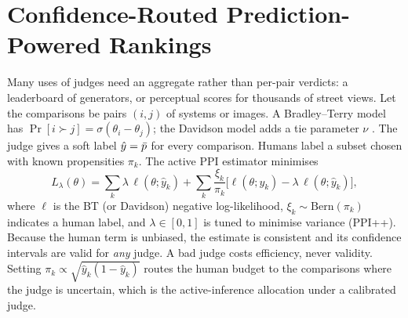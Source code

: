 \section{Confidence-Routed Prediction-Powered Rankings}\label{sec:ranking}

Many uses of judges need an aggregate rather than per-pair verdicts: a leaderboard of generators, or perceptual scores for thousands of street views.
Let the comparisons be pairs $(i,j)$ of systems or images. A Bradley--Terry model \citep{bradley1952rank} has $\Pr[i\succ j]=\sigma(\theta_i-\theta_j)$; the Davidson model adds a tie parameter $\nu$ \citep{davidson1970extending}.
The judge gives a soft label $\hat y=\bar p$ for every comparison. Humans label a subset chosen with known propensities $\pi_k$.
The active PPI estimator \citep{zrnic2024active,angelopoulos2023ppi} minimises
\begin{equation}\label{eq:ppibt}
  L_\lambda(\theta)=\sum_{k} \lambda\,\ell(\theta;\hat y_k)+\sum_k \frac{\xi_k}{\pi_k}\Big[\ell(\theta;y_k)-\lambda\,\ell(\theta;\hat y_k)\Big],
\end{equation}
where $\ell$ is the BT (or Davidson) negative log-likelihood, $\xi_k\sim\mathrm{Bern}(\pi_k)$ indicates a human label, and $\lambda\in[0,1]$ is tuned to minimise variance (PPI++).
Because the human term is unbiased, the estimate is consistent and its confidence intervals are valid for \emph{any} judge. A bad judge costs efficiency, never validity. Setting $\pi_k\propto\sqrt{\hat y_k(1-\hat y_k)}$ routes the human budget to the comparisons where the judge is uncertain, which is the active-inference allocation under a calibrated judge.

